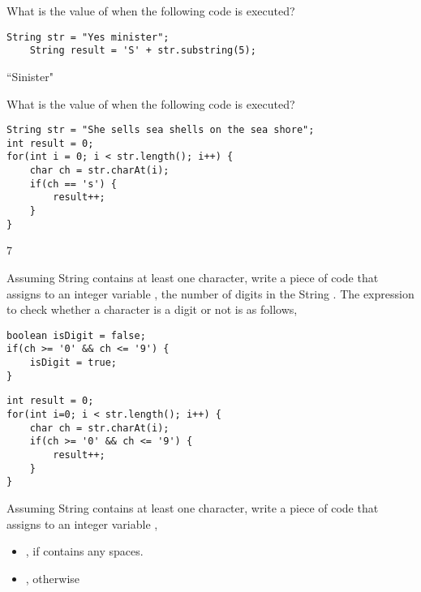 \begin{questions}
\question What is the value of  when the following code is executed?

\begin{lstlisting}[basicstyle=\large]
	String str = "Yes minister";
	String result = 'S' + str.substring(5);
\end{lstlisting}

\begin{solution}
``Sinister"
\end{solution}

\question What is the value of  when the following code is executed?

\begin{lstlisting}[basicstyle=\large]
String str = "She sells sea shells on the sea shore";
int result = 0;
for(int i = 0; i < str.length(); i++) {
	char ch = str.charAt(i);
	if(ch == 's') {
		result++;
	}
}
\end{lstlisting}

\begin{solution}
7
\end{solution}

\question Assuming String  contains at least one character, write a piece of code that assigns to an integer variable , the number of digits in the String . The expression to check whether a character  is a digit or not is as follows,

\begin{lstlisting}[basicstyle=\large]
boolean isDigit = false;
if(ch >= '0' && ch <= '9') {
	isDigit = true;
}
\end{lstlisting}

\begin{solution}
\begin{lstlisting}
int result = 0;
for(int i=0; i < str.length(); i++) {
	char ch = str.charAt(i);
	if(ch >= '0' && ch <= '9') {
		result++;
	}
} 
\end{lstlisting}	
\end{solution}

\question Assuming String  contains at least one character, write a piece of code that assigns to an integer variable , 

\begin{itemize}
\item {}, if  contains any spaces.	
\item {}, otherwise
\end{itemize}


\end{questions}
